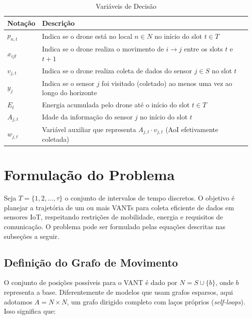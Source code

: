 \documentclass[
    12pt,
    oneside,
    a4paper,
    brazil
]{abntex2}
\begin{document}
    \begin{table}[htbp]
      \centering
      \caption{Variáveis de Decisão}
      \label{tab:variaveis}
      \begin{tabular}{>{\raggedright\arraybackslash}p{2.5cm} >{\raggedright\arraybackslash}p{12.5cm}}
        \toprule
        \textbf{Notação} & \textbf{Descrição} \\
        \midrule
        $p_{n,t}$ & Indica se o drone está no local $n \in N$ no início do slot $t \in T$ \\
        $x_{ijt}$ & Indica se o drone realiza o movimento de $i \to j$ entre os slots $t$ e $t+1$ \\
        $v_{j,t}$ & Indica se o drone realiza coleta de dados do sensor $j \in S$ no slot $t$ \\
        $y_j$ & Indica se o sensor $j$ foi visitado (coletado) ao menos uma vez ao longo do horizonte \\
        $E_t$ & Energia acumulada pelo drone até o início do slot $t \in T$ \\
        $A_{j,t}$ & Idade da informação do sensor $j$ no início do slot $t$ \\
        $w_{j,t}$ & Variável auxiliar que representa $A_{j,t}\cdot v_{j,t}$ (AoI efetivamente coletada) \\
        \bottomrule
      \end{tabular}
    \end{table}

    
    \section{Formulação do Problema}
    
    Seja $T = \{1, 2, \dots, \tau\}$ o conjunto de intervalos de tempo discretos. O objetivo
    é planejar a trajetória de um ou mais VANTs para coleta eficiente de dados em sensores IoT, respeitando restrições de mobilidade, energia e requisitos de comunicação. O problema pode ser formulado pelas equações descritas nas subseções a seguir.

    \subsection{Definição do Grafo de Movimento}

    O conjunto de posições possíveis para o VANT é dado por    
    $N = S \cup \{b\}$, onde $b$ representa a base.  
    Diferentemente de modelos que usam grafos esparsos, aqui adotamos $A = N \times N$, um grafo dirigido completo com laços próprios (\emph{self-loops}).  
    Isso significa que:
    
\end{document}
